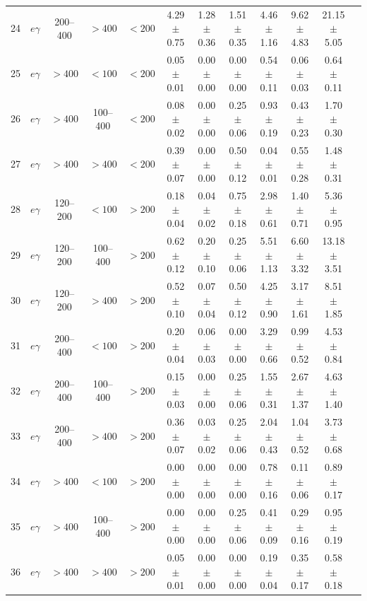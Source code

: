 \begin{table}[htbp]
{\begin{tabular}{|c|c|c|c|c|c|c|c|c|c|c|c|}
24 & $e\gamma$ & 200--400 & $>400$ & $<200$ & 4.29 $\pm$ 0.75 & 1.28 $\pm$ 0.36 & 1.51 $\pm$ 0.35 & 4.46 $\pm$ 1.16 & 9.62 $\pm$ 4.83 & 21.15 $\pm$ 5.05 &  \\
25 & $e\gamma$ & $>400$ & $<100$ & $<200$ & 0.05 $\pm$ 0.01 & 0.00 $\pm$ 0.00 & 0.00 $\pm$ 0.00 & 0.54 $\pm$ 0.11 & 0.06 $\pm$ 0.03 & 0.64 $\pm$ 0.11 &  \\
26 & $e\gamma$ & $>400$ & 100--400 & $<200$ & 0.08 $\pm$ 0.02 & 0.00 $\pm$ 0.00 & 0.25 $\pm$ 0.06 & 0.93 $\pm$ 0.19 & 0.43 $\pm$ 0.23 & 1.70 $\pm$ 0.30 &  \\
27 & $e\gamma$ & $>400$ & $>400$ & $<200$ & 0.39 $\pm$ 0.07 & 0.00 $\pm$ 0.00 & 0.50 $\pm$ 0.12 & 0.04 $\pm$ 0.01 & 0.55 $\pm$ 0.28 & 1.48 $\pm$ 0.31 &  \\
28 & $e\gamma$ & 120--200 & $<100$ & $>200$ & 0.18 $\pm$ 0.04 & 0.04 $\pm$ 0.02 & 0.75 $\pm$ 0.18 & 2.98 $\pm$ 0.61 & 1.40 $\pm$ 0.71 & 5.36 $\pm$ 0.95 &  \\
29 & $e\gamma$ & 120--200 & 100--400 & $>200$ & 0.62 $\pm$ 0.12 & 0.20 $\pm$ 0.10 & 0.25 $\pm$ 0.06 & 5.51 $\pm$ 1.13 & 6.60 $\pm$ 3.32 & 13.18 $\pm$ 3.51 &  \\
30 & $e\gamma$ & 120--200 & $>400$ & $>200$ & 0.52 $\pm$ 0.10 & 0.07 $\pm$ 0.04 & 0.50 $\pm$ 0.12 & 4.25 $\pm$ 0.90 & 3.17 $\pm$ 1.61 & 8.51 $\pm$ 1.85 &  \\
31 & $e\gamma$ & 200--400 & $<100$ & $>200$ & 0.20 $\pm$ 0.04 & 0.06 $\pm$ 0.03 & 0.00 $\pm$ 0.00 & 3.29 $\pm$ 0.66 & 0.99 $\pm$ 0.52 & 4.53 $\pm$ 0.84 &  \\
32 & $e\gamma$ & 200--400 & 100--400 & $>200$ & 0.15 $\pm$ 0.03 & 0.00 $\pm$ 0.00 & 0.25 $\pm$ 0.06 & 1.55 $\pm$ 0.31 & 2.67 $\pm$ 1.37 & 4.63 $\pm$ 1.40 &  \\
33 & $e\gamma$ & 200--400 & $>400$ & $>200$ & 0.36 $\pm$ 0.07 & 0.03 $\pm$ 0.02 & 0.25 $\pm$ 0.06 & 2.04 $\pm$ 0.43 & 1.04 $\pm$ 0.52 & 3.73 $\pm$ 0.68 &  \\
34 & $e\gamma$ & $>400$ & $<100$ & $>200$ & 0.00 $\pm$ 0.00 & 0.00 $\pm$ 0.00 & 0.00 $\pm$ 0.00 & 0.78 $\pm$ 0.16 & 0.11 $\pm$ 0.06 & 0.89 $\pm$ 0.17 &  \\
35 & $e\gamma$ & $>400$ & 100--400 & $>200$ & 0.00 $\pm$ 0.00 & 0.00 $\pm$ 0.00 & 0.25 $\pm$ 0.06 & 0.41 $\pm$ 0.09 & 0.29 $\pm$ 0.16 & 0.95 $\pm$ 0.19 &  \\
36 & $e\gamma$ & $>400$ & $>400$ & $>200$ & 0.05 $\pm$ 0.01 & 0.00 $\pm$ 0.00 & 0.00 $\pm$ 0.00 & 0.19 $\pm$ 0.04 & 0.35 $\pm$ 0.17 & 0.58 $\pm$ 0.18 &  \\
\hline
\end{tabular}}
\end{table}
